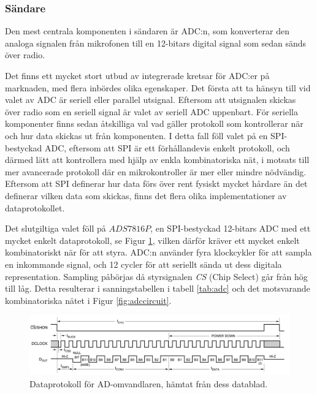 \documentclass[a4paper,10pt]{article}
\begin{document}
\subsubsection{Sändare}

Den mest centrala komponenten i sändaren är ADC:n, som konverterar den analoga
signalen från mikrofonen till en 12-bitars digital signal som sedan sänds över
radio.

Det finns ett mycket stort utbud av integrerade kretsar för ADC:er på marknaden,
med flera inbördes olika egenskaper. Det första att ta hänsyn till vid valet av
ADC är seriell eller parallel utsignal. Eftersom att utsignalen skickas över 
radio som en seriell signal är valet av seriell ADC uppenbart. För seriella 
komponenter finns sedan åtskilliga val vad gäller protokoll som kontrollerar när
och hur data skickas ut från komponenten. I detta fall föll valet på en 
SPI-bestyckad ADC, eftersom att SPI är ett förhållandevis enkelt protokoll, och
därmed lätt att kontrollera med hjälp av enkla kombinatoriska nät, i motsats 
till mer avancerade protokoll där en mikrokontroller är mer eller mindre
nödvändig. Eftersom att SPI definerar hur data förs över rent fysiskt mycket
hårdare än det definerar vilken data som skickas, finns det flera olika 
implementationer av dataprotokollet.

Det slutgiltiga valet föll på $ADS7816P$, en SPI-bestyckad 12-bitars 
ADC med ett mycket enkelt dataprotokoll, se Figur \ref{fig:adcproto}, vilken 
därför kräver ett mycket enkelt kombinatoriskt när för att styra. ADC:n använder 
fyra klockcykler för att sampla en inkommande signal, och 12 cycler för att
seriellt sända ut dess digitala representation. Sampling påbörjas då 
styrsignalen \emph{CS} (Chip Select) går från hög till låg. Detta resulterar i 
sanningstabellen i tabell \ref{tab:adc} och det motsvarande kombinatoriska nätet 
i Figur \ref{fig:adccircuit}.

\begin{figure}[h]
\centering
\includegraphics[width=\textwidth]{adcdiagram.png}
\caption{Dataprotokoll för AD-omvandlaren, hämtat från dess datablad.}
\label{fig:adcproto}
\end{figure}
\end{document}
